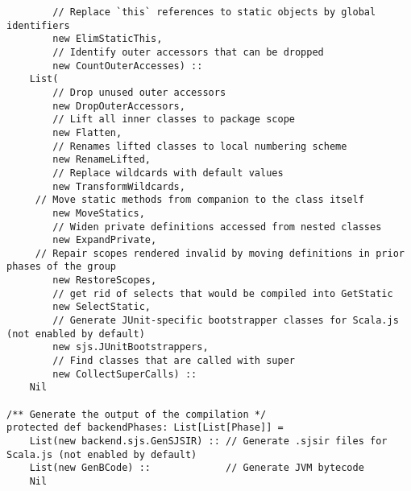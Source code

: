 \documentclass[letterpaper,12pt,titlepage,oneside,final]{book}
\begin{document}
\begin{verbatim}
		// Replace `this` references to static objects by global identifiers
		new ElimStaticThis,         
		// Identify outer accessors that can be dropped
		new CountOuterAccesses) :: 
	List(
		// Drop unused outer accessors
		new DropOuterAccessors,     
		// Lift all inner classes to package scope
		new Flatten,                
		// Renames lifted classes to local numbering scheme
		new RenameLifted,           
		// Replace wildcards with default values
		new TransformWildcards,     
	 // Move static methods from companion to the class itself
		new MoveStatics,           
		// Widen private definitions accessed from nested classes
		new ExpandPrivate,          
	 // Repair scopes rendered invalid by moving definitions in prior phases of the group
		new RestoreScopes,         
		// get rid of selects that would be compiled into GetStatic
		new SelectStatic,           
		// Generate JUnit-specific bootstrapper classes for Scala.js (not enabled by default)
		new sjs.JUnitBootstrappers, 
		// Find classes that are called with super
		new CollectSuperCalls) ::   
	Nil
	
/** Generate the output of the compilation */
protected def backendPhases: List[List[Phase]] =
	List(new backend.sjs.GenSJSIR) :: // Generate .sjsir files for Scala.js (not enabled by default)
	List(new GenBCode) ::             // Generate JVM bytecode
	Nil
\end{verbatim}
\end{document}
